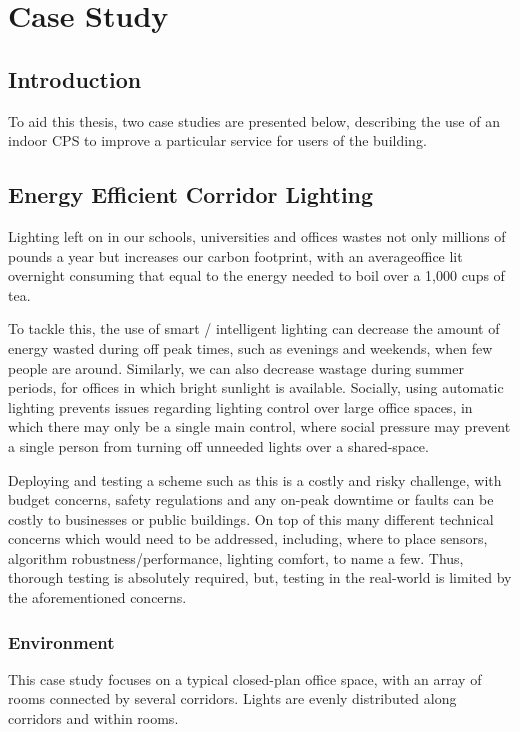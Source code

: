 \chapter{Case Study}
\label{chap:Case Study}
\section{Introduction}
\label{sec:Introduction}
To aid this thesis, two case studies are presented below, describing the use of an indoor CPS to improve a particular service for users of the building.
\section{Energy Efficient Corridor Lighting}
Lighting left on in our schools, universities and offices wastes not only millions of pounds a year but increases our carbon footprint, with an average\footnotemark office lit overnight consuming that equal to the energy needed to boil over a 1,000 cups of tea\cite{cambridgeEnergyWaste,carbonTrustEnergyWaste}. 

To tackle this, the use of smart / intelligent lighting can decrease the amount of energy wasted during off peak times, such as evenings and weekends, when few people are around. Similarly, we can also decrease wastage during summer periods, for offices in which bright sunlight is available. Socially, using automatic lighting prevents issues regarding lighting control over large office spaces, in which there may only be a single main control, where social pressure may prevent a single person from turning off unneeded lights over a shared-space.

Deploying and testing a scheme such as this is a costly and risky challenge, with budget concerns, safety regulations and any on-peak downtime or faults can be costly to businesses or public buildings. On top of this many different technical concerns which would need to be addressed, including, where to place sensors, algorithm robustness/performance, lighting comfort, to name a few. Thus, thorough testing is absolutely required, but, testing in the real-world is limited by the aforementioned concerns. 



\subsection{Environment}
\label{subsec:Environment}
This case study focuses on a typical closed-plan office space, with an array of rooms connected by several corridors. Lights are evenly distributed along corridors and within rooms. 


